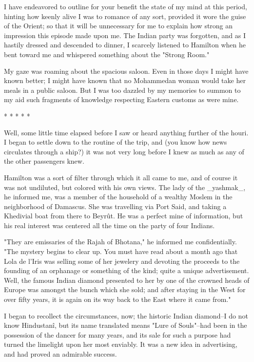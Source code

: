 I have endeavored to outline for your benefit the state of my mind at
this period, hinting how keenly alive I was to romance of any sort,
provided it wore the guise of the Orient; so that it will be
unnecessary for me to explain how strong an impression this episode
made upon me. The Indian party was forgotten, and as I hastily dressed
and descended to dinner, I scarcely listened to Hamilton when he bent
toward me and whispered something about the "Strong Room."

My gaze was roaming about the spacious saloon. Even in those days I
might have known better; I might have known that no Mohammedan woman
would take her meals in a public saloon. But I was too dazzled by my
memories to summon to my aid such fragments of knowledge respecting
Eastern customs as were mine.

       *       *       *       *       *

Well, some little time elapsed before I saw or heard anything further
of the houri. I began to settle down to the routine of the trip, and
(you know how news circulates through a ship?) it was not very long
before I knew as much as any of the other passengers knew.

Hamilton was a sort of filter through which it all came to me, and of
course it was not undiluted, but colored with his own views. The lady
of the _yashmak_, he informed me, was a member of the household of a
wealthy Moslem in the neighborhood of Damascus. She was travelling via
Port Said, and taking a Khedivial boat from there to Beyrût. He was a
perfect mine of information, but his real interest was centered all
the time on the party of four Indians.

"They are emissaries of the Rajah of Bhotana," he informed me
confidentially. "The mystery begins to clear up. You must have read
about a month ago that Lola de l'Iris was selling some of her jewelery
and devoting the proceeds to the founding of an orphanage or something
of the kind; quite a unique advertisement. Well, the famous Indian
diamond presented to her by one of the crowned heads of Europe was
amongst the bunch which she sold; and after staying in the West for
over fifty years, it is again on its way back to the East where it
came from."

I began to recollect the circumstances, now; the historic Indian
diamond--I do not know Hindustanî, but its name translated means "Lure
of Souls"--had been in the possession of the dancer for many years,
and its sale for such a purpose had turned the limelight upon her most
enviably. It was a new idea in advertising, and had proved an
admirable success.

